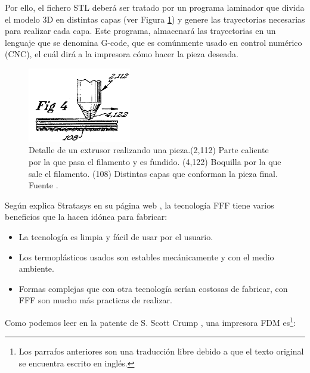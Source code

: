Por ello, el fichero STL deberá ser tratado por un programa laminador que divida el modelo 3D en distintas capas (ver Figura \ref{fig:detalle_capas}) y genere las trayectorias necesarias para realizar cada capa. Este programa, almacenará las trayectorias en un lenguaje que se denomina G-code, que es comúnmente usado en control numérico (CNC), el cuál dirá a la impresora cómo hacer la pieza deseada.

\begin{figure}[!ht]
    \centering
    \includegraphics[width=0.4\textwidth]{images/capas_fdm.png}
    \caption[Detalle  de un extrusor realizando una pieza.]{Detalle  de un extrusor realizando una pieza.(2,112) Parte caliente por la que pasa el filamento y es fundido. (4,122) Boquilla por la que sale el filamento. (108) Distintas capas que conforman la pieza final. Fuente \cite{crump1992apparatus}.}
    \label{fig:detalle_capas}
\end{figure}

Según explica Stratasys en su página web \cite{FDMTechnology}, la tecnología FFF tiene varios beneficios que la hacen idónea para fabricar:

\begin{itemize}
    \item La tecnología es limpia y fácil de usar por el usuario.
    \item Los termoplásticos usados son estables mecánicamente y con el medio ambiente.
    \item Formas complejas que con otra tecnología serían costosas de fabricar, con FFF son mucho más practicas de realizar.
\end{itemize}

Como podemos leer en la patente de S. Scott Crump \cite{crump1992apparatus}, una impresora FDM es\footnote{Los parrafos anteriores son una traducción libre debido a que el texto original se encuentra escrito en inglés.}:

